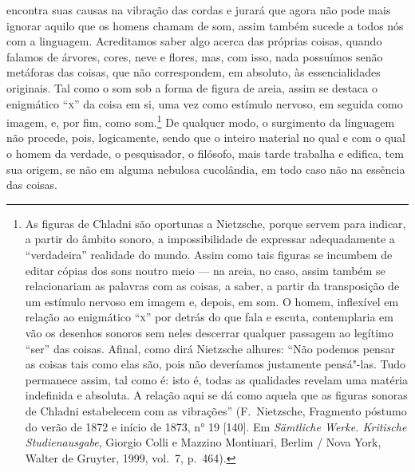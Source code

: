 encontra suas causas na vibração
das cordas e jurará que agora não pode mais ignorar aquilo que os
homens chamam de som, assim também sucede a todos nós com a
linguagem. Acreditamos saber algo acerca das próprias coisas, quando
falamos de árvores, cores, neve e flores, mas, com isso, nada possuímos
senão metáforas das coisas, que não correspondem, em absoluto, às
essencialidades originais. Tal como o som sob a forma de figura de
areia, assim se destaca o enigmático ``\textsc{x}'' da coisa em si, uma vez como
estímulo nervoso, em seguida como imagem, e, por fim, como
som.\footnote{ As figuras de Chladni são oportunas a Nietzsche, porque
servem para indicar, a partir do âmbito sonoro, a impossibilidade de
expressar adequadamente a “verdadeira” realidade do mundo. Assim como
tais figuras se incumbem de editar cópias dos sons noutro meio --- na
areia, no caso, assim também se relacionariam as palavras com as
coisas, a saber, a partir da transposição de um estímulo nervoso em
imagem e, depois, em som. O homem, inflexível em relação ao enigmático
“\textsc{x}” por detrás do que fala e escuta, contemplaria em vão os desenhos
sonoros sem neles descerrar qualquer passagem ao legítimo “ser” das
coisas. Afinal, como dirá Nietzsche alhures: “Não podemos pensar as coisas
tais como elas são, pois não deveríamos justamente pensá"-las. Tudo
permanece assim, tal como é: isto é, todas as qualidades revelam uma
matéria indefinida e absoluta. A relação aqui se dá como aquela que
as figuras sonoras de Chladni estabelecem com as vibrações” (F.~Nietzsche,
Fragmento póstumo do verão de 1872 e início de 1873, n° 19 [140].
Em \textit{Sämtliche Werke. Kritische Studienausgabe}, Giorgio
Colli e Mazzino Montinari, Berlim / Nova York, Walter de Gruyter, 1999,
vol.~7, p.~464).} De qualquer modo, o surgimento da linguagem não
procede, pois, logicamente, sendo que o inteiro material no qual e com
o qual o homem da verdade, o pesquisador, o filósofo, mais tarde
trabalha e edifica, tem sua origem, se não em alguma nebulosa
cucolândia, em todo caso não na essência das coisas.

